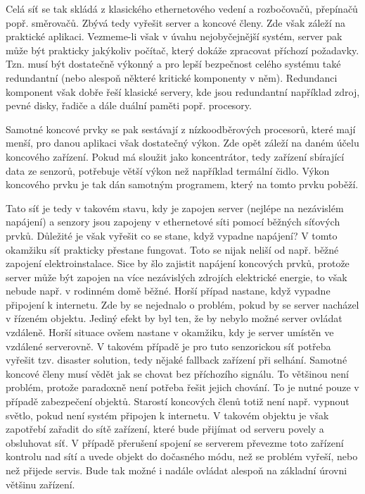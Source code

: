 Celá síť se tak skládá z klasického ethernetového vedení a rozbočovačů, přepínačů popř. směrovačů. Zbývá tedy vyřešit server a koncové členy. Zde však záleží na praktické aplikaci. Vezmeme-li však v úvahu nejobyčejnější systém, server pak může být prakticky jakýkoliv počítač, který dokáže zpracovat příchozí požadavky. Tzn. musí být dostatečně výkonný a pro lepší bezpečnost celého systému také redundantní (nebo alespoň některé kritické komponenty v něm). Redundanci komponent však dobře řeší klasické servery, kde jsou redundantní například zdroj, pevné disky, řadiče a dále duální paměti popř. procesory.

Samotné koncové prvky se pak sestávají z nízkoodběrových procesorů, které mají menší, pro danou aplikaci však dostatečný výkon. Zde opět záleží na daném účelu koncového zařízení. Pokud má sloužit jako koncentrátor, tedy zařízení sbírající data ze senzorů, potřebuje větší výkon než například termální čidlo. Výkon koncového prvku je tak dán samotným programem, který na tomto prvku poběží.

Tato síť je tedy v takovém stavu, kdy je zapojen server (nejlépe na nezávislém napájení) a senzory jsou zapojeny v ethernetové síti pomocí běž\-ných síťových prvků. Důležité je však vyřešit co se stane, když vypadne napájení? V tomto okamžiku síť prakticky přestane fungovat. Toto se nijak neliší od např. běžné zapojení elektroinstalace. Sice by šlo zajistit napájení koncových prvků, protože server může být zapojen na více nezávislých zdro\-jích elektrické energie, to však nebude např. v rodinném domě běžné. Horší případ nastane, když vypadne připojení k internetu. Zde by se nejednalo o problém, pokud by se server nacházel v řízeném objektu. Jediný efekt by byl ten, že by nebylo možné server ovládat vzdáleně. Horší situace ovšem nastane v okamžiku, kdy je server umístěn ve vzdálené serverovně. V takovém případě je pro tuto senzorickou síť potřeba vyřešit tzv. disaster solution, tedy nějaké fallback zařízení při selhání. Samotné koncové členy musí vědět jak se chovat bez příchozího signálu. To většinou není problém, protože paradoxně není potřeba řešit jejich chování. To je nutné pouze v případě zabezpečení objektů. Starostí koncových členů totiž není např. vypnout světlo, pokud není systém připojen k internetu. V takovém objektu je však zapotřebí zařadit do sítě zařízení, které bude přijímat od serveru povely a obsluhovat síť. V případě přerušení spojení se serverem převezme toto zařízení kontrolu nad sítí a uvede objekt do dočasného módu, než se problém vyřeší, nebo než přijede servis. Bude tak možné i nadále ovládat alespoň na základní úrovni většinu zařízení.


